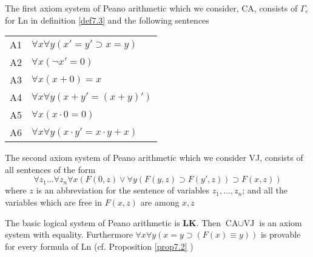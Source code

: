 \documentclass[11pt]{article}
\def \LK {\textbf{LK}}
\def \CA {\text{CA}}
\def \VJ {\text{VJ}}
\begin{document}
\begin{definition}[]
The first axiom system of Peano arithmetic which we consider,  CA, consists of \(\Gamma_e\) for
Ln in definition \ref{def7.3} and the following sentences

\begin{center}
\begin{tabular}{ll}
A1 & \(\forall x\forall y(x'=y'\supset x=y)\)\\
A2 & \(\forall x(\neg x'=0)\)\\
A3 & \(\forall x(x+0)=x\)\\
A4 & \(\forall x \forall y (x+y'=(x+y)')\)\\
A5 & \(\forall x(x\cdot 0=0)\)\\
A6 & \(\forall x \forall y(x\cdot y'=x\cdot y+x)\)\\
\end{tabular}
\end{center}

The second axiom system of Peano arithmetic which we consider VJ, consists of all sentences of
the form
\begin{equation*}
\forall z_1 \dots \forall z_n \forall x(F(0,z)\vee \forall y(F(y,z)\supset F(y',z))\supset F(x,z))
\end{equation*}
where \(z\) is an abbreviation for the sentence of variables \(z_1,\dots,z_n\); and all the
variables which are free in \(F(x,z)\) are among \(x,z\)

The basic logical system of Peano arithmetic is \(\LK\). Then \(\CA\cup\VJ\) is an axiom system
with equality. Furthermore \(\forall x\forall y(x=y\supset(F(x)\equiv y))\) is provable for every
formula of Ln (cf. Proposition \ref{prop7.2} )  
\end{definition}
\end{document}

